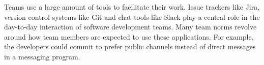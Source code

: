 Teams use a large amount of tools to facilitate their work. Issue trackers like Jira, version control systems like Git and chat tools like Slack play a central role in the day-to-day interaction of software development teams. Many team norms revolve around how team members are expected to use these applications. For example, the developers could commit to prefer public channels instead of direct messages in a messaging program. 


